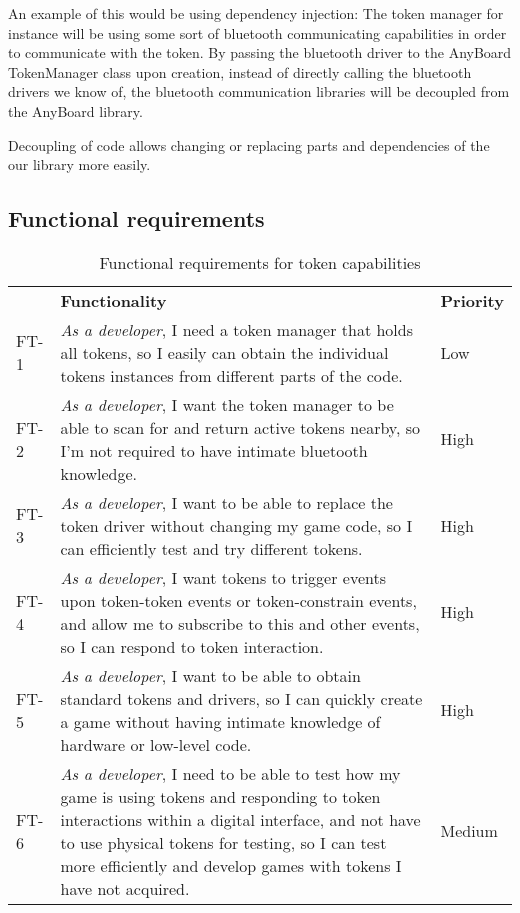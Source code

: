 An example of this would be using dependency injection: The token manager for instance will be using some sort of bluetooth communicating capabilities in order to communicate with the token. By passing the bluetooth driver to the AnyBoard TokenManager class upon creation, instead of directly calling the bluetooth drivers we know of, the bluetooth communication libraries will be decoupled from the AnyBoard library. 

Decoupling of code allows changing or replacing parts and dependencies of the our library more easily. 

\subsection{Functional requirements}


\begin{table}
\centering
\caption{Functional requirements for token capabilities}
\label{freq:token}

\begin{tabular}{ | m{1cm} | m{9cm}| m{1.5cm} | }
     & {\bf Functionality}                                                                                                                                                                                                                                                       & {\bf Priority} \\
FT-1 & \emph{As a developer}, I need a token manager that holds all tokens, so I easily can obtain the individual tokens instances from different parts of the code.                                                                                                                    & Low            \\
FT-2 & \emph{As a developer}, I want the token manager to be able to scan for and return active tokens nearby, so I'm not required to have intimate bluetooth knowledge.                                                                                                                & High           \\
FT-3 & \emph{As a developer}, I want to be able to replace the token driver without changing my game code, so I can efficiently test and try different tokens.                                                                                                                          & High           \\
FT-4 & \emph{As a developer}, I want tokens to trigger events upon token-token events or token-constrain events, and allow me to subscribe to this and other events, so I can respond to token interaction. & High         \\
FT-5 & \emph{As a developer}, I want to be able to obtain standard tokens and drivers, so I can quickly create a game without having intimate knowledge of hardware or low-level code.      & High           \\
FT-6 & \emph{As a developer}, I need to be able to test how my game is using tokens and responding to token interactions within a digital interface, and not have to use physical tokens for testing, so I can test more efficiently and develop games with tokens I have not acquired. & Medium \\


\end{tabular}
\end{table}
